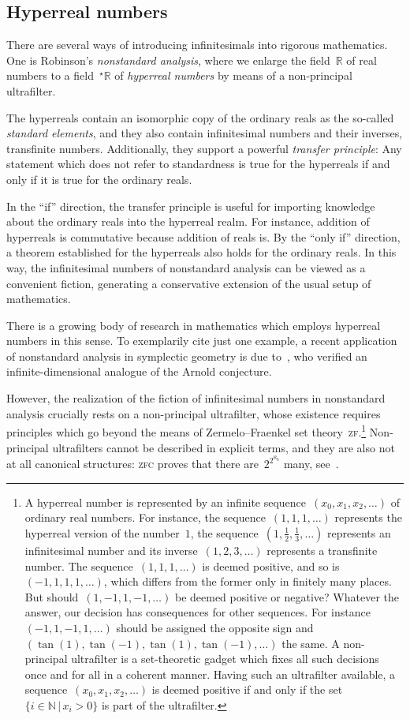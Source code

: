 \documentclass[graybox]{svmult}
\newcommand{\NN}{\mathbb{N}}
\newcommand{\RR}{\mathbb{R}}
\renewcommand{\_}{\mathpunct{.}\,}
\newcommand{\?}{\,{:}\,}
\begin{document}
\subsection{Hyperreal numbers} There are several ways of introducing
infinitesimals into rigorous mathematics. One is Robinson's \emph{nonstandard
analysis}, where we enlarge the field~$\RR$ of real numbers to a
field~$^\star\RR$ of \emph{hyperreal numbers} by means of a non-principal
ultrafilter.

The hyperreals contain an isomorphic copy of the ordinary reals as the
so-called \emph{standard elements}, and they also contain infinitesimal numbers
and their inverses, transfinite numbers. Additionally, they support a powerful \emph{transfer
principle}: Any statement which does not refer to standardness is true for the
hyperreals if and only if it is true for the ordinary reals.

In the ``if'' direction, the transfer principle is useful for importing
knowledge about the ordinary reals into the hyperreal realm. For instance,
addition of hyperreals is commutative because addition of reals is.
By the ``only if'' direction, a theorem established for the hyperreals also
holds for the ordinary reals. In this way, the infinitesimal numbers of
nonstandard analysis can be viewed as a convenient fiction, generating a
conservative extension of the usual setup of mathematics.

There is a growing body of research in mathematics which employs hyperreal
numbers in this sense. To exemplarily cite just one example, a recent
application of nonstandard analysis in symplectic geometry is due to~\cite{fabert:non-squeezing,fabert:floer}, who verified an
infinite-dimensional analogue of the Arnold conjecture.

However, the realization of the fiction of infinitesimal numbers in nonstandard analysis crucially rests on a non-principal
ultrafilter, whose existence requires principles which go beyond the means of
Zermelo--Fraenkel set theory~\textsc{zf}.\footnote{A hyperreal number is
represented by an infinite sequence~$(x_0,x_1,x_2,\ldots)$ of ordinary real
numbers. For instance, the sequence~$(1,1,1,\ldots)$ represents the hyperreal
version of the number~$1$, the sequence~$(1,\frac{1}{2},\frac{1}{3},\ldots)$
represents an infinitesimal number and its inverse~$(1,2,3,\ldots)$ represents
a transfinite number.
%
The sequence~$(1,1,1,\ldots)$ is deemed positive, and so is~$(-1,1,1,1,\ldots)$,
which differs from the former only in finitely many places. But
should~$(1,-1,1,-1,\ldots)$ be deemed positive or negative? Whatever the
answer, our decision has consequences for other sequences. For
instance~$(-1,1,-1,1,\ldots)$ should be assigned the opposite sign
and~$(\tan(1),\tan(-1),\tan(1),\tan(-1),\ldots)$ the same.
%
A non-principal ultrafilter is a set-theoretic gadget which fixes all such
decisions once and for all in a coherent manner. Having such an ultrafilter
available, a sequence~$(x_0,x_1,x_2,\ldots)$ is deemed positive if and only if
the set~$\{i \in \NN \,|\, x_i > 0\}$ is part of the ultrafilter.}
Non-principal ultrafilters cannot be described in explicit terms, and
they are also not at all canonical structures: \textsc{zfc} proves that there
are~$2^{2^{\aleph_0}}$ many, see~\cite{pospisil:ultrafilters}.
\end{document}
